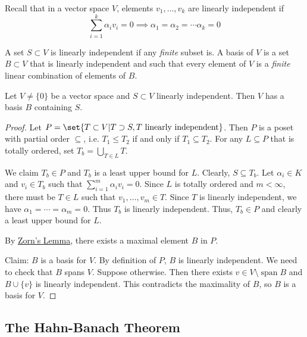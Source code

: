 \documentclass{article}
\DeclareMathOperator{\spn}{span}
\begin{document}
Recall that in a vector space $V$, elements $v_1, \dotsc, v_k$ are linearly independent if
\begin{equation*}
    \sum_{i=1}^k \alpha_i v_i = 0 \implies \alpha_1 = \alpha_2 = \dotsb \alpha_k = 0
\end{equation*}

A set $S \subset V$ is linearly independent if any \emph{finite} subset is.
A basis of $V$ is a set $B \subset V$ that is linearly independent and such that every element of $V$ is a \emph{finite} linear combination of elements of $B$.

\begin{prop}
    Let $V \neq \{0\}$ be a vector space and $S \subset V$ linearly independent. Then $V$ has a basis $B$ containing $S$.
\end{prop}

\begin{proof}
    Let $P = \set{T \subset V | T \supset S, T \text{ linearly independent}}$. Then $P$ is a poset with partial order $\subseteq$, i.e. $T_1 \leq T_2$ if and only if $T_1 \subseteq T_2$. For any $L \subseteq P$ that is totally ordered, set $T_b = \bigcup_{T \in L} T$.

    We claim $T_b \in P$ and $T_b$ is a least upper bound for $L$. Clearly, $S \subseteq T_b$.
    Let $\alpha_i \in K$ and $v_i \in T_b$ such that $\sum_{i=1}^m \alpha_i v_i = 0$. Since $L$ %
    is totally ordered and $m < \infty$, there must be $T \in L$ such that $v_1, \dotsc, v_m \in T$.
    Since $T$ is linearly independent, we have $\alpha_1 = \dotsb = \alpha_m = 0$. Thus $T_b$ is linearly independent.
    Thus, $T_b \in P$ and clearly a least upper bound for $L$.

    By \hyperlink{lem:zorn}{Zorn's Lemma}, there exists a maximal element $B$ in $P$.

    Claim: $B$ is a basis for $V$. By definition of $P$, $B$ is linearly independent. We need to check that $B$ spans $V$.
    Suppose otherwise. Then there exists $v \in V \setminus \spn{B}$ and $B \cup \{v\}$ is linearly independent.
    This contradicts the maximality of $B$, so $B$ is a basis for $V$.
\end{proof}

\subsection{The Hahn-Banach Theorem}

\end{document}
